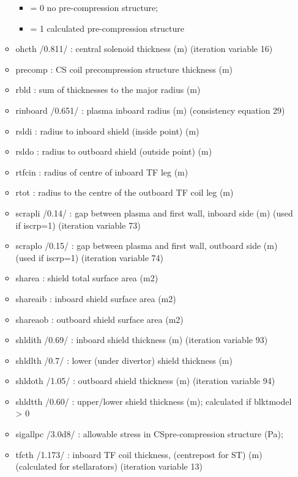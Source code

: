 \documentclass[]{article}
\providecommand{\tightlist}{%
  \setlength{\itemsep}{0pt}\setlength{\parskip}{0pt}}
\begin{document}
\begin{itemize}
\begin{itemize}
    \begin{itemize}
    \tightlist
    \item
      = 0 no pre-compression structure;
    \item
      = 1 calculated pre-compression structure
    \end{itemize}
  \item
    ohcth /0.811/ : central solenoid thickness (m) (iteration variable
    16)
  \item
    precomp : CS coil precompression structure thickness (m)
  \item
    rbld : sum of thicknesses to the major radius (m)
  \item
    rinboard /0.651/ : plasma inboard radius (m) (consistency equation
    29)
  \item
    rsldi : radius to inboard shield (inside point) (m)
  \item
    rsldo : radius to outboard shield (outside point) (m)
  \item
    rtfcin : radius of centre of inboard TF leg (m)
  \item
    rtot : radius to the centre of the outboard TF coil leg (m)
  \item
    scrapli /0.14/ : gap between plasma and first wall, inboard side (m)
    (used if iscrp=1) (iteration variable 73)
  \item
    scraplo /0.15/ : gap between plasma and first wall, outboard side
    (m) (used if iscrp=1) (iteration variable 74)
  \item
    sharea : shield total surface area (m2)
  \item
    shareaib : inboard shield surface area (m2)
  \item
    shareaob : outboard shield surface area (m2)
  \item
    shldith /0.69/ : inboard shield thickness (m) (iteration variable
    93)
  \item
    shldlth /0.7/ : lower (under divertor) shield thickness (m)
  \item
    shldoth /1.05/ : outboard shield thickness (m) (iteration variable
    94)
  \item
    shldtth /0.60/ : upper/lower shield thickness (m); calculated if
    blktmodel \textgreater{} 0
  \item
    sigallpc /3.0d8/ : allowable stress in CSpre-compression structure
    (Pa);
  \item
    tfcth /1.173/ : inboard TF coil thickness, (centrepost for ST) (m)
    (calculated for stellarators) (iteration variable 13)

\end{itemize}
\end{itemize}
\end{document}
